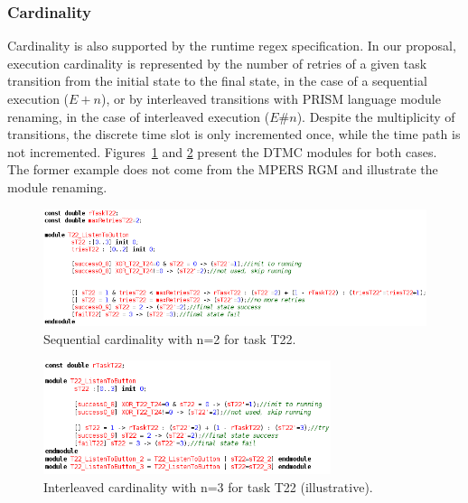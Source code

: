 \subsubsection{Cardinality}

Cardinality is also supported by the runtime regex specification. In our proposal, execution cardinality is represented by the number of retries of a given task transition from the initial state to the final state, in the case of a sequential execution ($E+n$), or by interleaved transitions with PRISM language module renaming, in the case of interleaved execution ($E\#n$). Despite the multiplicity of transitions, the discrete time slot is only incremented once, while the time path is not incremented. Figures~\ref{fig:PRISM_MUL_SEQ_TSKS} and \ref{fig:PRISM_MUL_PAR_TSKS} present the DTMC modules for both cases. The former example does not come from the MPERS RGM and illustrate the module renaming.

\begin{figure}[ht!]
\includegraphics[width=1\textwidth]{imgs/PRISM_MUL_SEQ_TSKS.png}
\caption{Sequential cardinality with n=2 for task T22.}
\label{fig:PRISM_MUL_SEQ_TSKS}
\end{figure}

\begin{figure}[ht!]
\includegraphics[width=0.75\textwidth]{imgs/PRISM_MUL_PAR_TSKS.png}
\caption{Interleaved cardinality with n=3 for task T22 (illustrative).}
\label{fig:PRISM_MUL_PAR_TSKS}
\end{figure}

\FloatBarrier


